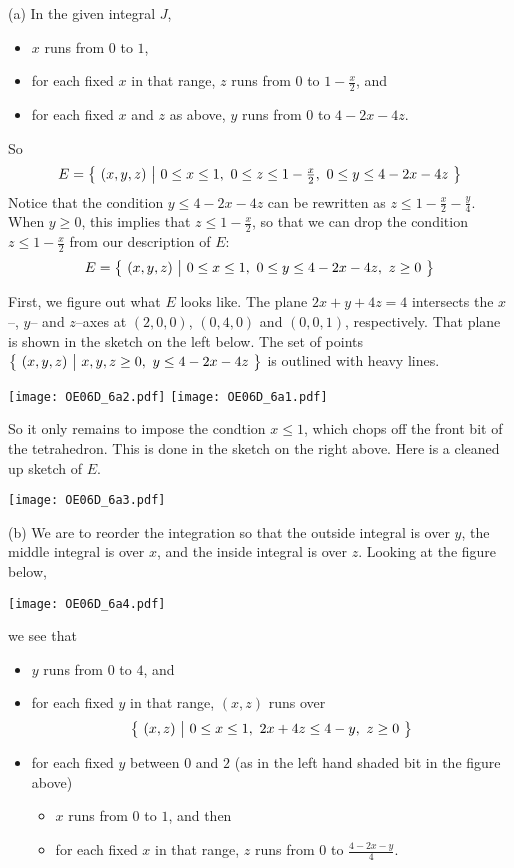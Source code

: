 \begin{solution}
(a) In the given integral $J$,
\begin{itemize}
\item
$x$ runs from $0$ to $1$,
\item
for each fixed $x$ in that range, $z$ runs from 0 to $1-\frac{x}{2}$, and
\item
for each fixed $x$ and $z$ as above, $y$ runs from $0$ to $4-2x-4z$.
\end{itemize}
So 
\begin{align*}
E = \Set{(x,y,z)}{0\le x\le 1,\ 0\le z\le 1-\tfrac{x}{2},\ 
            0 \le y\le 4-2x-4z}
\end{align*}
Notice that the condition $y\le 4-2x-4z$ can be rewritten
as $z\le 1-\frac{x}{2} -\frac{y}{4}$. When $y\ge 0$, this implies
that $z\le 1-\frac{x}{2}$, so that we can drop the condition 
$z\le 1-\frac{x}{2}$ from our description of $E$:
\begin{align*}
E = \big\{ \ (x,y,z)\ \big|\ 0\le x\le 1,\ 0 \le y\le 4-2x-4z,\ z\ge 0\ \big\}
\end{align*}



First, we figure out what $E$ looks like. 
The plane $2x+y+4z=4$ intersects the $x$--, $y$-- and $z$--axes
at $(2,0,0)$, $(0,4,0)$ and $(0,0,1)$, respectively.
That plane is shown in the sketch on the left below.
The set of points $\big\{ \ (x,y,z)\ \big|\ x,y,z\ge 0,\  y\le 4-2x-4z\ \big\}$
is outlined with heavy lines.
\begin{center}
     \texttt{[image: OE06D\_6a2.pdf]}\quad
     \texttt{[image: OE06D\_6a1.pdf]}
\end{center}
So it only remains to impose the condtion $x\le 1$, which chops off
the front bit of the tetrahedron. This is done in the sketch on the
right above. Here is a cleaned up sketch of $E$.
\begin{center}
     \texttt{[image: OE06D\_6a3.pdf]}
\end{center}

(b)
We are to reorder the integration so that the outside integral
is over $y$, the middle integral is over $x$, and the inside integral 
is over $z$. Looking at the figure below, 
\begin{center}
     \texttt{[image: OE06D\_6a4.pdf]}
\end{center}
we see that
\begin{itemize}
\item
$y$ runs from $0$ to $4$, and
\item
for each fixed $y$ in that range, $(x,z)$ runs over
\begin{equation*}
\Set{(x,z)}{0\le x\le 1,\ 2x+4z\le 4-y,\ z\ge 0}
\end{equation*}
\item
for each fixed $y$ between $0$ and $2$ (as in the left hand shaded bit in
the figure above)
\begin{itemize}
\item 
$x$ runs from $0$ to $1$, and then
\item
for each fixed $x$ in that range, $z$ runs from $0$ to $\frac{4-2x-y}{4}$. 
\end{itemize}


\end{itemize}
\end{solution}
